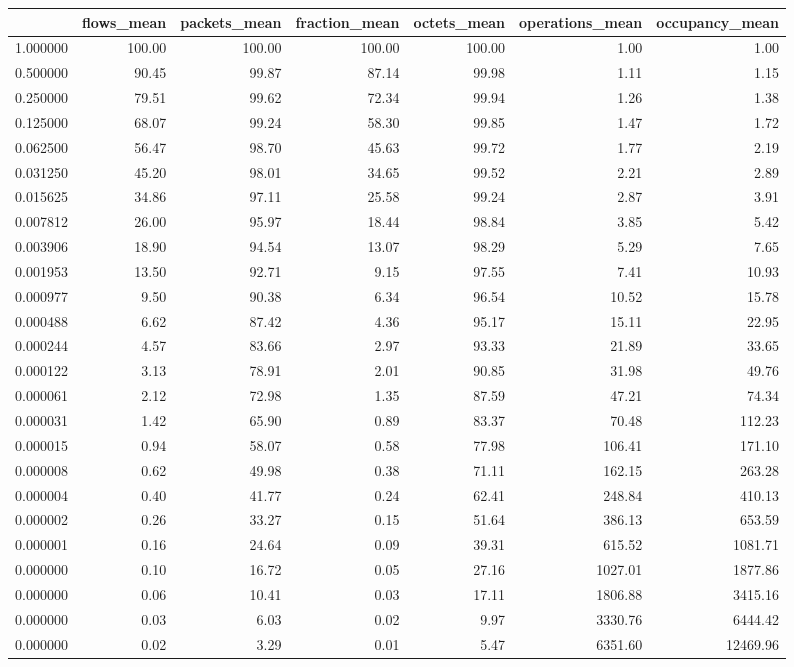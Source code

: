 \begin{tabular}{lrrrrrr}
\toprule
 & flows_mean & packets_mean & fraction_mean & octets_mean & operations_mean & occupancy_mean \\
\midrule
1.000000 & 100.00 & 100.00 & 100.00 & 100.00 & 1.00 & 1.00 \\
0.500000 & 90.45 & 99.87 & 87.14 & 99.98 & 1.11 & 1.15 \\
0.250000 & 79.51 & 99.62 & 72.34 & 99.94 & 1.26 & 1.38 \\
0.125000 & 68.07 & 99.24 & 58.30 & 99.85 & 1.47 & 1.72 \\
0.062500 & 56.47 & 98.70 & 45.63 & 99.72 & 1.77 & 2.19 \\
0.031250 & 45.20 & 98.01 & 34.65 & 99.52 & 2.21 & 2.89 \\
0.015625 & 34.86 & 97.11 & 25.58 & 99.24 & 2.87 & 3.91 \\
0.007812 & 26.00 & 95.97 & 18.44 & 98.84 & 3.85 & 5.42 \\
0.003906 & 18.90 & 94.54 & 13.07 & 98.29 & 5.29 & 7.65 \\
0.001953 & 13.50 & 92.71 & 9.15 & 97.55 & 7.41 & 10.93 \\
0.000977 & 9.50 & 90.38 & 6.34 & 96.54 & 10.52 & 15.78 \\
0.000488 & 6.62 & 87.42 & 4.36 & 95.17 & 15.11 & 22.95 \\
0.000244 & 4.57 & 83.66 & 2.97 & 93.33 & 21.89 & 33.65 \\
0.000122 & 3.13 & 78.91 & 2.01 & 90.85 & 31.98 & 49.76 \\
0.000061 & 2.12 & 72.98 & 1.35 & 87.59 & 47.21 & 74.34 \\
0.000031 & 1.42 & 65.90 & 0.89 & 83.37 & 70.48 & 112.23 \\
0.000015 & 0.94 & 58.07 & 0.58 & 77.98 & 106.41 & 171.10 \\
0.000008 & 0.62 & 49.98 & 0.38 & 71.11 & 162.15 & 263.28 \\
0.000004 & 0.40 & 41.77 & 0.24 & 62.41 & 248.84 & 410.13 \\
0.000002 & 0.26 & 33.27 & 0.15 & 51.64 & 386.13 & 653.59 \\
0.000001 & 0.16 & 24.64 & 0.09 & 39.31 & 615.52 & 1081.71 \\
0.000000 & 0.10 & 16.72 & 0.05 & 27.16 & 1027.01 & 1877.86 \\
0.000000 & 0.06 & 10.41 & 0.03 & 17.11 & 1806.88 & 3415.16 \\
0.000000 & 0.03 & 6.03 & 0.02 & 9.97 & 3330.76 & 6444.42 \\
0.000000 & 0.02 & 3.29 & 0.01 & 5.47 & 6351.60 & 12469.96 \\
\bottomrule
\end{tabular}
